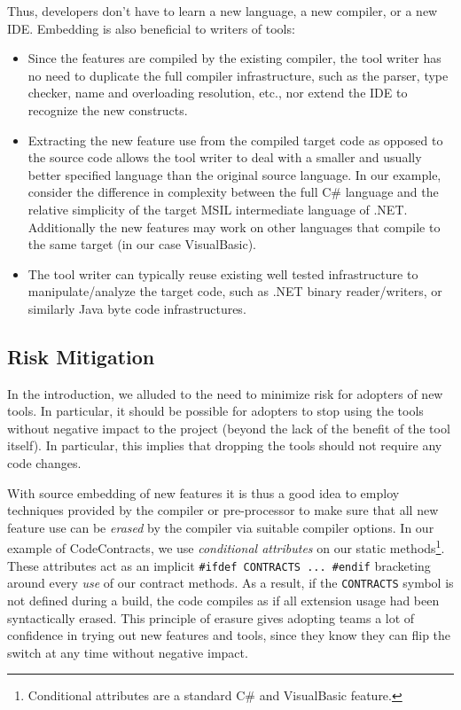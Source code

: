 \documentclass[10pt, conference, compsocconf]{IEEEtran}
\newcommand{\codefamily}{\sffamily}
\newcommand{\csharp}{C\#}
\newcommand{\code}[1]{\lstinline[basicstyle=\codefamily\small]{#1}}
\begin{document}
\noindent Thus, developers don't have to learn a new language, a new compiler,
or a new IDE. Embedding is also beneficial to writers of tools:
\begin{itemize}
  \item Since the features are compiled by the existing
    compiler, the tool writer has no need to duplicate the full
    compiler infrastructure, such as the parser, type
    checker, name and overloading resolution, etc., nor extend the IDE
    to recognize the new constructs.

  \item Extracting the new feature use from the compiled target code as
    opposed to the source code allows the tool writer to deal with a
    smaller and usually better specified language than the original
    source language. In our example, consider the difference in
    complexity between the full \csharp{} language and the relative
    simplicity of the target MSIL intermediate language of
    .NET. Additionally the new features may work on other
    languages that compile to the same target (in our case VisualBasic).
    
  \item The tool writer can typically reuse existing well tested
    infrastructure to manipulate/analyze the target code, such as .NET
    binary reader/writers, or similarly Java byte code
    infrastructures.
\end{itemize}



\subsection*{Risk Mitigation}
\label{sec:mitigation}
In the introduction, we alluded to the need to minimize risk for
adopters of new tools. In particular, it should be possible for
adopters to stop using the tools without negative impact to the
project (beyond the lack of the benefit of the tool itself). In
particular, this implies that dropping the tools should not require any
code changes. 

With source embedding of new features it is thus a good idea to employ
techniques provided by the compiler or pre-processor to make sure that
all new feature use can be \emph{erased} by the compiler via suitable
compiler options. In our example of CodeContracts, we use
\emph{conditional attributes} on our static
methods\footnote{Conditional attributes are a standard \csharp{} and
  VisualBasic feature.}. These attributes
act as an implicit \code{#ifdef CONTRACTS ... #endif} bracketing
around every \emph{use} of our contract methods. As a result, if the
\code{CONTRACTS} symbol is not defined during a build, the code
compiles as if all extension usage had been syntactically erased. This
principle of erasure gives adopting teams a lot of confidence in
trying out new features and tools, since they know they can flip the
switch at any time without negative impact.
\end{document}

